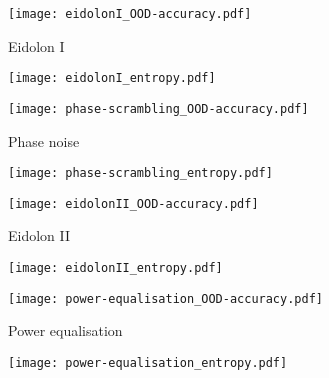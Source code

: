 \begin{figure}
		\begin{subfigure}{\figwidth}
			\centering
			\texttt{[image: eidolonI\_OOD-accuracy.pdf]}
			\vspace{\captionspace}
			\caption{Eidolon I}
			\vspace{\captionspaceII}
		\end{subfigure}\hfill
		\begin{subfigure}{\figwidth}
			\centering        \texttt{[image: eidolonI\_entropy.pdf]}
			\vspace{\captionspace}
			\caption*{}
			\vspace{\captionspaceII}
		\end{subfigure}\hfill
		\begin{subfigure}{\figwidth}
			\centering
			\texttt{[image: phase-scrambling\_OOD-accuracy.pdf]}
			\vspace{\captionspace}
			\caption{Phase noise}
			\vspace{\captionspaceII}
		\end{subfigure}\hfill
		\begin{subfigure}{\figwidth}
			\centering
			\texttt{[image: phase-scrambling\_entropy.pdf]}
			\vspace{\captionspace}
			\caption*{}
			\vspace{\captionspaceII}
		\end{subfigure}\hfill
		
	\begin{subfigure}{\figwidth}
		\centering
		\texttt{[image: eidolonII\_OOD-accuracy.pdf]}
		\vspace{\captionspace}
		\caption{Eidolon II}
		\vspace{\captionspaceII}
	\end{subfigure}\hfill
	\begin{subfigure}{\figwidth}
		\centering
		\texttt{[image: eidolonII\_entropy.pdf]}
		\vspace{\captionspace}
		\caption*{}
		\vspace{\captionspaceII}
	\end{subfigure}\hfill
	\begin{subfigure}{\figwidth}
		\centering
		\texttt{[image: power-equalisation\_OOD-accuracy.pdf]}
		\vspace{\captionspace}
		\caption{Power equalisation}
		\vspace{\captionspaceII}
	\end{subfigure}\hfill
	\begin{subfigure}{\figwidth}
		\centering
		\texttt{[image: power-equalisation\_entropy.pdf]}
		\vspace{\captionspace}
		\caption*{}
		\vspace{\captionspaceII}
	\end{subfigure}\hfill
	

\end{figure}
